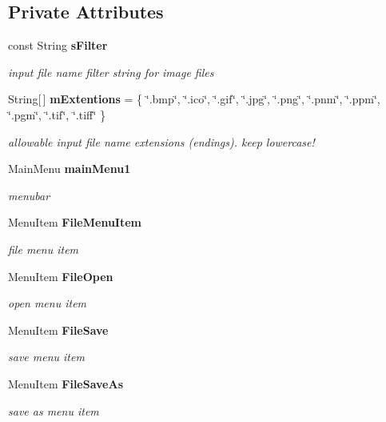 \subsection*{Private Attributes}
\begin{CompactItemize}
\item 
const String {\bf s\-Filter}
\begin{CompactList}\small\item\em input file name filter string for image files \item\end{CompactList}\item 
String[$\,$] {\bf m\-Extentions} = \{ \char`\"{}.bmp\char`\"{}, \char`\"{}.ico\char`\"{}, \char`\"{}.gif\char`\"{}, \char`\"{}.jpg\char`\"{}, \char`\"{}.png\char`\"{}, \char`\"{}.pnm\char`\"{}, \char`\"{}.ppm\char`\"{}, \char`\"{}.pgm\char`\"{}, \char`\"{}.tif\char`\"{}, \char`\"{}.tiff\char`\"{} \}
\begin{CompactList}\small\item\em allowable input file name extensions (endings). keep lowercase! \item\end{CompactList}\item 
Main\-Menu {\bf main\-Menu1}
\begin{CompactList}\small\item\em menubar \item\end{CompactList}\item 
Menu\-Item {\bf File\-Menu\-Item}
\begin{CompactList}\small\item\em file menu item \item\end{CompactList}\item 
Menu\-Item {\bf File\-Open}
\begin{CompactList}\small\item\em open menu item \item\end{CompactList}\item 
Menu\-Item {\bf File\-Save}
\begin{CompactList}\small\item\em save menu item \item\end{CompactList}\item 
Menu\-Item {\bf File\-Save\-As}
\begin{CompactList}\small\item\em save as menu item \item\end{CompactList}\item 

\end{CompactItemize}
